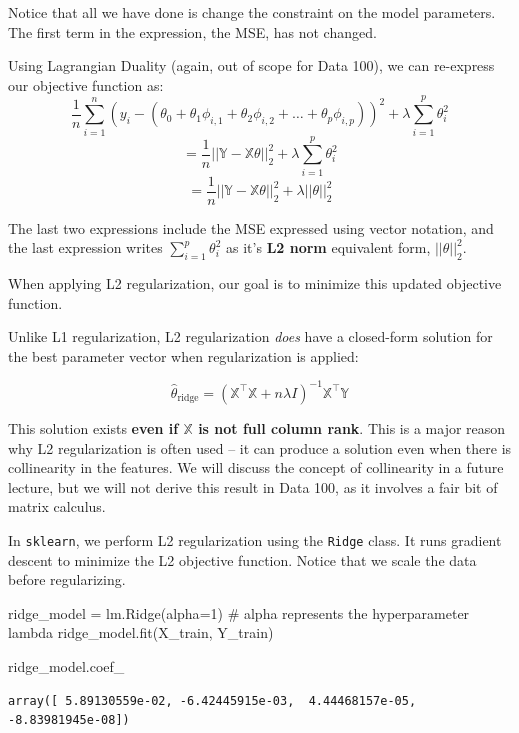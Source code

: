 \documentclass[
  letterpaper,
  DIV=11,
  numbers=noendperiod]{scrreprt}
\newenvironment{Shaded}{\begin{snugshade}}{\end{snugshade}}
\newcommand{\CommentTok}[1]{\textcolor[rgb]{0.37,0.37,0.37}{#1}}
\newcommand{\DecValTok}[1]{\textcolor[rgb]{0.68,0.00,0.00}{#1}}
\newcommand{\NormalTok}[1]{\textcolor[rgb]{0.00,0.23,0.31}{#1}}
\newcommand{\OperatorTok}[1]{\textcolor[rgb]{0.37,0.37,0.37}{#1}}
\begin{document}
Notice that all we have done is change the constraint on the model
parameters. The first term in the expression, the MSE, has not changed.

Using Lagrangian Duality (again, out of scope for Data 100), we can
re-express our objective function as:
\[\frac{1}{n} \sum_{i=1}^n (y_i - (\theta_0 + \theta_1 \phi_{i, 1} + \theta_2 \phi_{i, 2} + \ldots + \theta_p \phi_{i, p}))^2 + \lambda \sum_{i=1}^p \theta_i^2\]
\[= \frac{1}{n}||\mathbb{Y} - \mathbb{X}\theta||_2^2 + \lambda \sum_{i=1}^p \theta_i^2\]
\[= \frac{1}{n}||\mathbb{Y} - \mathbb{X}\theta||_2^2 + \lambda || \theta ||_2^2\]

The last two expressions include the MSE expressed using vector
notation, and the last expression writes \(\sum_{i=1}^p \theta_i^2\) as
it's \textbf{L2 norm} equivalent form, \(|| \theta ||_2^2\).

When applying L2 regularization, our goal is to minimize this updated
objective function.

Unlike L1 regularization, L2 regularization \emph{does} have a
closed-form solution for the best parameter vector when regularization
is applied:

\[\hat\theta_{\text{ridge}} = (\mathbb{X}^{\top}\mathbb{X} + n\lambda I)^{-1}\mathbb{X}^{\top}\mathbb{Y}\]

This solution exists \textbf{even if \(\mathbb{X}\) is not full column
rank}. This is a major reason why L2 regularization is often used -- it
can produce a solution even when there is collinearity in the features.
We will discuss the concept of collinearity in a future lecture, but we
will not derive this result in Data 100, as it involves a fair bit of
matrix calculus.

In \texttt{sklearn}, we perform L2 regularization using the
\texttt{Ridge} class. It runs gradient descent to minimize the L2
objective function. Notice that we scale the data before regularizing.

\begin{Shaded}
\begin{Highlighting}[]
\NormalTok{ridge\_model }\OperatorTok{=}\NormalTok{ lm.Ridge(alpha}\OperatorTok{=}\DecValTok{1}\NormalTok{) }\CommentTok{\# alpha represents the hyperparameter lambda}
\NormalTok{ridge\_model.fit(X\_train, Y\_train)}

\NormalTok{ridge\_model.coef\_}
\end{Highlighting}
\end{Shaded}

\begin{verbatim}
array([ 5.89130559e-02, -6.42445915e-03,  4.44468157e-05, -8.83981945e-08])
\end{verbatim}
\end{document}
